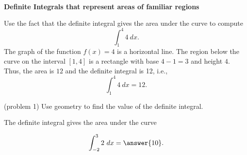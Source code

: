\documentclass[handout]{ximera}
\begin{document}
\begin{center}
\textbf{Definite Integrals that represent areas of familiar regions}
\end{center}


\begin{example}[example 1]
Use the fact that the definite integral gives the area under the curve to compute
\[\int_{1}^4 4 \ dx.\]
The graph of the function $f(x) = 4$ is a horizontal line. The region below the curve on the interval $[1,4]$ is a rectangle with base $4-1=3$
and height $4$.  Thus, the area is $12$ and the definite integral is 12, i.e.,
\[\int_1^4 4 \ dx =12.\]

\begin{image}
\end{image}

\end{example}


\begin{problem}(problem 1)
Use geometry to find the value of the definite integral.
\begin{hint}
The definite integral gives the area under the curve
\end{hint}
\[\int_{-2}^{3} 2 \ dx = \answer{10}.\]
\end{problem}
\end{document}

